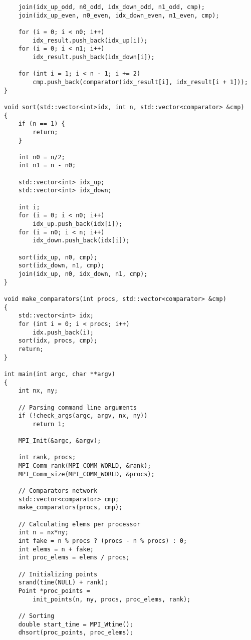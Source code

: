 \documentclass[oneside,final,14pt]{extreport}
\begin{document}
\begin{verbatim}
    join(idx_up_odd, n0_odd, idx_down_odd, n1_odd, cmp);
    join(idx_up_even, n0_even, idx_down_even, n1_even, cmp);

    for (i = 0; i < n0; i++)
        idx_result.push_back(idx_up[i]);
    for (i = 0; i < n1; i++)
        idx_result.push_back(idx_down[i]);

    for (int i = 1; i < n - 1; i += 2)
        cmp.push_back(comparator(idx_result[i], idx_result[i + 1]));
}

void sort(std::vector<int>idx, int n, std::vector<comparator> &cmp)
{
    if (n == 1) {
        return;
    }

    int n0 = n/2;
    int n1 = n - n0;

    std::vector<int> idx_up;
    std::vector<int> idx_down;

    int i;
    for (i = 0; i < n0; i++)
        idx_up.push_back(idx[i]);
    for (i = n0; i < n; i++)
        idx_down.push_back(idx[i]);

    sort(idx_up, n0, cmp);
    sort(idx_down, n1, cmp);
    join(idx_up, n0, idx_down, n1, cmp);
}

void make_comparators(int procs, std::vector<comparator> &cmp)
{
    std::vector<int> idx;
    for (int i = 0; i < procs; i++)
        idx.push_back(i);
    sort(idx, procs, cmp);
    return;
}

int main(int argc, char **argv)
{
    int nx, ny;

    // Parsing command line arguments
    if (!check_args(argc, argv, nx, ny))
        return 1;

    MPI_Init(&argc, &argv);

    int rank, procs;
    MPI_Comm_rank(MPI_COMM_WORLD, &rank);
    MPI_Comm_size(MPI_COMM_WORLD, &procs);

    // Comparators network
    std::vector<comparator> cmp;
    make_comparators(procs, cmp);

    // Calculating elems per processor
    int n = nx*ny;
    int fake = n % procs ? (procs - n % procs) : 0;
    int elems = n + fake;
    int proc_elems = elems / procs;

    // Initializing points
    srand(time(NULL) + rank);
    Point *proc_points =
        init_points(n, ny, procs, proc_elems, rank);

    // Sorting
    double start_time = MPI_Wtime();
    dhsort(proc_points, proc_elems);


\end{verbatim}
\end{document}
